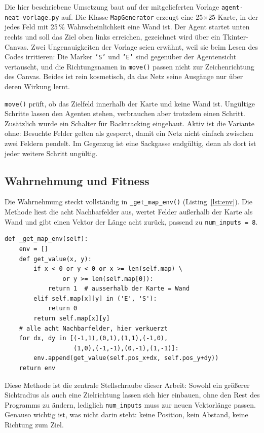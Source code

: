 \documentclass[sigconf]{acmart}
\begin{document}
Die hier beschriebene Umsetzung baut auf der mitgelieferten Vorlage \texttt{agent-\allowbreak neat-\allowbreak vorlage.py} auf. Die Klasse \texttt{MapGenerator} erzeugt eine 25$\times$25-Karte, in der jedes Feld mit 25\,\% Wahrscheinlichkeit eine Wand ist. Der Agent startet unten rechts und soll das Ziel oben links erreichen, gezeichnet wird über ein Tkinter-Canvas. Zwei Ungenauigkeiten der Vorlage seien erwähnt, weil sie beim Lesen des Codes irritieren: Die Marker \texttt{'S'} und \texttt{'E'} sind gegenüber der Agentensicht vertauscht, und die Richtungsnamen in \texttt{move()} passen nicht zur Zeichenrichtung des Canvas. Beides ist rein kosmetisch, da das Netz seine Ausgänge nur über deren Wirkung lernt.

\texttt{move()} prüft, ob das Zielfeld innerhalb der Karte und keine Wand ist. Ungültige Schritte lassen den Agenten stehen, verbrauchen aber trotzdem einen Schritt. Zusätzlich wurde ein Schalter für Backtracking eingebaut. Aktiv ist die Variante ohne: Besuchte Felder gelten als gesperrt, damit ein Netz nicht einfach zwischen zwei Feldern pendelt. Im Gegenzug ist eine Sackgasse endgültig, denn ab dort ist jeder weitere Schritt ungültig.

\subsection{Wahrnehmung und Fitness}
Die Wahrnehmung steckt vollständig in \texttt{\_get\_\allowbreak map\_env()} (Listing~\ref{lst:env}). Die Methode liest die acht Nachbarfelder aus, wertet Felder außerhalb der Karte als Wand und gibt einen Vektor der Länge acht zurück, passend zu \texttt{num\_inputs = 8}.

\begin{lstlisting}[float=t,caption={Wahrnehmung im Ausgangszustand: acht Nachbarfelder, keine Zielinformation.},label={lst:env}]
def _get_map_env(self):
    env = []
    def get_value(x, y):
        if x < 0 or y < 0 or x >= len(self.map) \
                or y >= len(self.map[0]):
            return 1  # ausserhalb der Karte = Wand
        elif self.map[x][y] in ('E', 'S'):
            return 0
        return self.map[x][y]
    # alle acht Nachbarfelder, hier verkuerzt
    for dx, dy in [(-1,1),(0,1),(1,1),(-1,0),
                   (1,0),(-1,-1),(0,-1),(1,-1)]:
        env.append(get_value(self.pos_x+dx, self.pos_y+dy))
    return env
\end{lstlisting}

Diese Methode ist die zentrale Stellschraube dieser Arbeit: Sowohl ein größerer Sichtradius als auch eine Zielrichtung lassen sich hier einbauen, ohne den Rest des Programms zu ändern, lediglich \texttt{num\_inputs} muss zur neuen Vektorlänge passen. Genauso wichtig ist, was nicht darin steht: keine Position, kein Abstand, keine Richtung zum Ziel.
\end{document}
